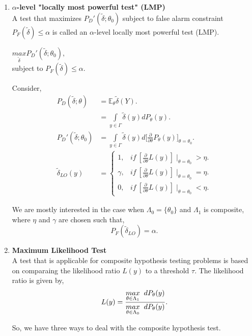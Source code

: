 \documentclass[a4paper,english,12pt]{article}
\begin{document}
\begin{enumerate}
\item \textbf{$\alpha$-level "locally most powerful test" (LMP)}
\\A test that maximizes $P_{D}'(\widetilde{\delta};\theta_0)$ subject to false alarm constraint $	P_F(\widetilde{\delta}) \leq \alpha$ is called an $\alpha$-level locally most powerful test (LMP).

\begin{center}
$\underset{\widetilde{\delta}}{max} P_{D}'(\widetilde{\delta};\theta_0),$ \\ subject to $	P_F(\widetilde{\delta}) \leq \alpha$.
\end{center}

Consider,
\begin{align}
P_D(\widetilde{ \delta};\theta) &= \mathbb{E}_\theta \widetilde{ \delta}(Y). \nonumber \\
&= \underset{y \in \Gamma}{\int}  \widetilde{\delta}(y) dP_\theta(y). \nonumber \\
P_{D}'(\widetilde{ \delta};\theta_0) &=  \underset{y \in \Gamma}{\int}  \widetilde{\delta}(y) d\Bigg[\frac{\partial}{\partial \theta}P_\theta(y)\Bigg]_{\theta = \theta_0}. \nonumber \\
\widetilde{\delta}_{LO}(y) &= 
\begin{cases} 
1, &if~ [\frac{\partial}{\partial \theta}L(y) ] \mid_{\theta = \theta_0} > \eta. \\
\gamma, &if~ [\frac{\partial}{\partial \theta}L(y)] \mid_{\theta = \theta_0} = \eta. \\
0, &if~ [\frac{\partial}{\partial \theta}L(y) ] \mid_{\theta = \theta_0} < \eta.
\end{cases}
\end{align}

We are mostly interested in the case when $\Lambda_0 = \{\theta_0\}$ and $\Lambda_1$ is composite, where $\eta$ and $\gamma$ are chosen such that, 
\begin{equation*}
P_F(\widetilde{\delta}_{LO}) = \alpha.
\end{equation*}

\item \textbf{Maximum Likelihood Test}\\
A test that is applicable for composite hypothesis testing problems is based on comparaing the likelihood ratio $ L(y)$ to a threshold $\tau$. The likelihood ratio is given by,
\begin{equation}
L(y)=\dfrac{\underset{\theta \in \Lambda_1}{max} \hspace{0.2cm} dP_\theta(y)}{\underset{\theta \in \Lambda_0}{max} \hspace{0.2cm} dP_\theta(y)}. 
\end{equation}

So, we have three ways to deal with the composite hypothesis test.
\end{enumerate}
\end{document}
